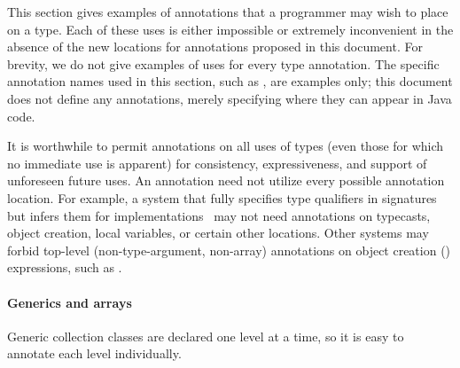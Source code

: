 \documentclass[10pt]{article}
\begin{document}
This section gives examples of annotations that a programmer may wish to
place on a type.
Each of these uses is either impossible or extremely inconvenient in the
absence of the new locations for annotations proposed in this document.
For brevity, we do not give examples of uses for every type annotation.
The specific annotation names used in this
section, such as , are examples only; this document does not
define any annotations, merely specifying where they can appear in Java
code.


It is worthwhile to permit annotations on all uses of types (even those for
which no immediate use is apparent) for consistency, expressiveness, and
support of unforeseen future uses.
%
An annotation need not utilize every
possible annotation location.  For example, a system that fully specifies
type qualifiers in signatures but infers them for implementations~\cite{GreenfieldboyceF2005}
may not need annotations on typecasts, object creation, local variables, or
certain other locations.  Other
systems may forbid top-level (non-type-argument, non-array) annotations
on object creation () expressions, such as .


\paragraph{Generics and arrays\label{generics-and-arrays}}
Generic collection classes are
declared one level at a time, so it is easy to annotate each level
individually.
\end{document}
